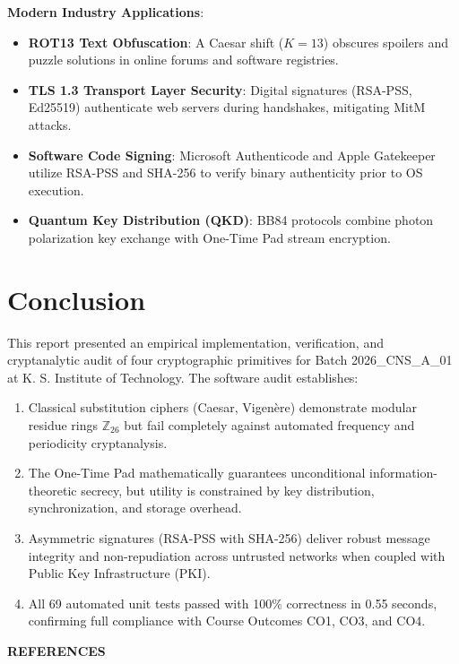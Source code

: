 \documentclass[12pt,a4paper]{report}
\begin{document}
\vspace{0.4em}
\textbf{Modern Industry Applications}:
\begin{itemize}[noitemsep,topsep=2pt]
    \item \textbf{ROT13 Text Obfuscation}: A Caesar shift ($K=13$) obscures spoilers and puzzle solutions in online forums and software registries.
    \item \textbf{TLS 1.3 Transport Layer Security}: Digital signatures (RSA-PSS, Ed25519) authenticate web servers during handshakes, mitigating MitM attacks.
    \item \textbf{Software Code Signing}: Microsoft Authenticode and Apple Gatekeeper utilize RSA-PSS and SHA-256 to verify binary authenticity prior to OS execution.
    \item \textbf{Quantum Key Distribution (QKD)}: BB84 protocols combine photon polarization key exchange with One-Time Pad stream encryption.
\end{itemize}

\section{Conclusion}
This report presented an empirical implementation, verification, and cryptanalytic audit of four cryptographic primitives for Batch 2026\_CNS\_A\_01 at K. S. Institute of Technology. The software audit establishes:
\begin{enumerate}[noitemsep,topsep=2pt]
    \item Classical substitution ciphers (Caesar, Vigen\`ere) demonstrate modular residue rings $\mathbb{Z}_{26}$ but fail completely against automated frequency and periodicity cryptanalysis.
    \item The One-Time Pad mathematically guarantees unconditional information-theoretic secrecy, but utility is constrained by key distribution, synchronization, and storage overhead.
    \item Asymmetric signatures (RSA-PSS with SHA-256) deliver robust message integrity and non-repudiation across untrusted networks when coupled with Public Key Infrastructure (PKI).
    \item All 69 automated unit tests passed with 100\% correctness in 0.55 seconds, confirming full compliance with Course Outcomes CO1, CO3, and CO4.
\end{enumerate}

\newpage

\begin{center}
    {\fontsize{14}{16}\bfseries REFERENCES}\\[1.5em]
\end{center}
\end{document}
